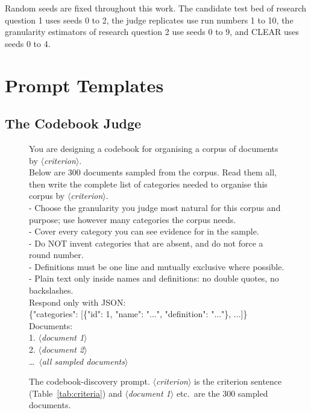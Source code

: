 \documentclass[11pt,a4paper,oneside]{report}
\newcommand{\ph}[1]{\textcolor{blue!60!black}{\rmfamily\itshape $\langle$#1$\rangle$}}
\begin{document}
Random seeds are fixed throughout this work. The candidate test bed of research question 1 uses seeds 0 to 2, the judge replicates use run numbers 1 to 10, the granularity estimators of research question 2 use seeds 0 to 9, and CLEAR uses seeds 0 to 4.

\clearpage
\chapter{Prompt Templates}\label{app:prompts}

\section{The Codebook Judge}\label{app:prompts-judge}

\begin{figure}[htbp]
\begin{promptbox}
\small\ttfamily
You are designing a codebook for organising a corpus of documents by \ph{criterion}.\\[4pt]
Below are 300 documents sampled from the corpus. Read them all, then write the complete list of categories needed to organise this corpus by \ph{criterion}.\\
- Choose the granularity you judge most natural for this corpus and purpose; use however many categories the corpus needs.\\
- Cover every category you can see evidence for in the sample.\\
- Do NOT invent categories that are absent, and do not force a round number.\\
- Definitions must be one line and mutually exclusive where possible.\\
- Plain text only inside names and definitions: no double quotes, no backslashes.\\[4pt]
Respond only with JSON:\\
\{"categories": [\{"id": 1, "name": "...", "definition": "..."\}, ...]\}\\[4pt]
Documents:\\
1. \ph{document 1}\\
2. \ph{document 2}\\
\ldots\ \ph{all sampled documents}
\end{promptbox}
\caption[Codebook-discovery prompt]{The codebook-discovery prompt. \ph{criterion} is the criterion sentence (Table~\ref{tab:criteria}) and \ph{document 1} etc.\ are the 300 sampled documents.}
\label{fig:prompt-codebook}
\end{figure}
\end{document}
